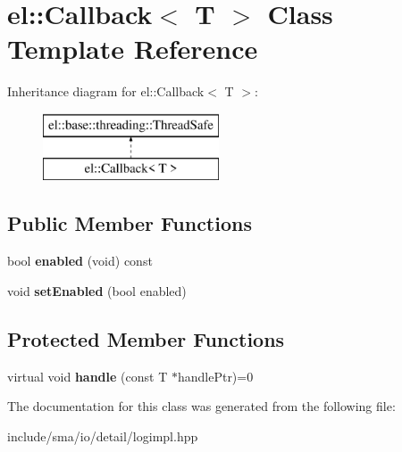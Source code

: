 \hypertarget{classel_1_1Callback}{\section{el\-:\-:Callback$<$ T $>$ Class Template Reference}
\label{classel_1_1Callback}
}
Inheritance diagram for el\-:\-:Callback$<$ T $>$\-:\begin{figure}[H]
\begin{center}
\leavevmode
\includegraphics[height=2.000000cm]{classel_1_1Callback}
\end{center}
\end{figure}
\subsection*{Public Member Functions}
\begin{DoxyCompactItemize}
\item 
\hypertarget{classel_1_1Callback_a1e3089fd19a11965e7b98bd423116bbd}{bool {\bfseries enabled} (void) const }\label{classel_1_1Callback_a1e3089fd19a11965e7b98bd423116bbd}

\item 
\hypertarget{classel_1_1Callback_a05e68cb0b5ea4423913fa2ec4ea306b4}{void {\bfseries set\-Enabled} (bool enabled)}\label{classel_1_1Callback_a05e68cb0b5ea4423913fa2ec4ea306b4}

\end{DoxyCompactItemize}
\subsection*{Protected Member Functions}
\begin{DoxyCompactItemize}
\item 
\hypertarget{classel_1_1Callback_a8997c7971d65062c374ef24e653061be}{virtual void {\bfseries handle} (const T $\ast$handle\-Ptr)=0}\label{classel_1_1Callback_a8997c7971d65062c374ef24e653061be}

\end{DoxyCompactItemize}


The documentation for this class was generated from the following file\-:\begin{DoxyCompactItemize}
\item 
include/sma/io/detail/logimpl.\-hpp\end{DoxyCompactItemize}
